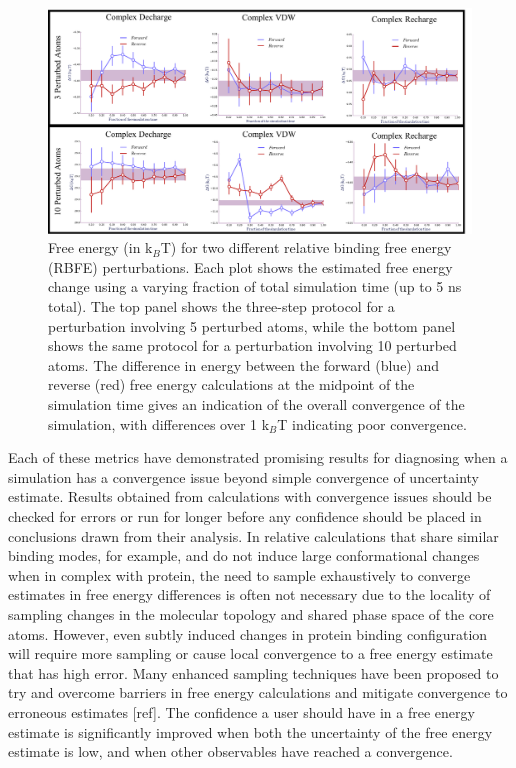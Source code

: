 \documentclass[9pt,bestpractices]{livecoms}
\begin{document}
\begin{figure}
    \centering
    \includegraphics[width=0.95\linewidth]{paper/figures/figX/Forward_Reverse_Fig.pdf}
    \caption{Free energy (in k$_{B}$T) for two different relative binding free energy (RBFE) perturbations. 
    Each plot shows the estimated free energy change using a varying fraction of total simulation time (up to 5 ns total). 
    The top panel shows the three-step protocol for a perturbation involving 5 perturbed atoms, while the bottom panel shows the same protocol for a perturbation involving 10 perturbed atoms. The difference in energy between the forward (blue) and reverse (red) free energy calculations at the midpoint of the simulation time gives an indication of the overall convergence of the simulation, with differences over 1 k$_{B}$T indicating poor convergence.}
    \label{fig:convergence_forward_reverse}
\end{figure}

Each of these metrics have demonstrated promising results for diagnosing when a simulation has a convergence issue beyond simple convergence of uncertainty estimate. 
Results obtained from calculations with convergence issues should be checked for errors or run for longer before any confidence should be placed in conclusions drawn from their analysis.
In relative calculations that share similar binding modes, for example, and do not induce large conformational changes when in complex with protein, the need to sample exhaustively to converge estimates in free energy differences is often not necessary due to the locality of sampling changes in the molecular topology and shared phase space of the core atoms.
However, even subtly induced changes in protein binding configuration will require more sampling or cause local convergence to a free energy estimate that has high error.
Many enhanced sampling techniques have been proposed to try and overcome barriers in free energy calculations and mitigate convergence to erroneous estimates [ref]. 
The confidence a user should have in a free energy estimate is significantly improved when both the uncertainty of the free energy estimate is low, and when other observables have reached a convergence.
\end{document}
